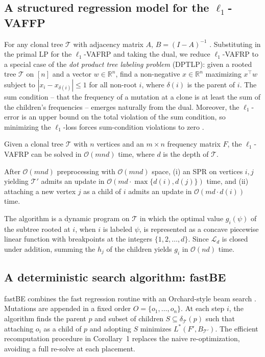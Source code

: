 \documentclass[11pt]{article}
\begin{document}
\subsection{A structured regression model for the $\ell_1$-VAFFP}
For any clonal tree $\mathcal{T}$ with adjacency matrix $A$, $B = (I - A)^{-1}$ \cite{elkebir2016copynumber}. Substituting in the primal LP for the $\ell_1$-VAFRP and taking the dual, we reduce $\ell_1$-VAFRP to a special case of the \emph{dot product tree labeling problem} (DPTLP): given a rooted tree $\mathcal{T}$ on $[n]$ and a vector $w \in \mathbb{R}^n$, find a non-negative $x \in \mathbb{R}^n$ maximizing $x^\top w$ subject to $|x_i - x_{\delta(i)}| \le 1$ for all non-root $i$, where $\delta(i)$ is the parent of $i$. The sum condition \cite{elkebir2015ancestree,popic2015lichee,malikic2015citup} -- that the frequency of a mutation at a clone is at least the sum of the children's frequencies -- emerges naturally from the dual. Moreover, the $\ell_1$-error is an upper bound on the total violation of the sum condition, so minimizing the $\ell_1$-loss forces sum-condition violations to zero \cite{bonizzoni2017sum}.

\begin{theorem}
Given a clonal tree $\mathcal{T}$ with $n$ vertices and an $m \times n$ frequency matrix $F$, the $\ell_1$-VAFRP can be solved in $\mathcal{O}(mnd)$ time, where $d$ is the depth of $\mathcal{T}$.
\end{theorem}

\begin{corollary}
After $\mathcal{O}(mnd)$ preprocessing with $\mathcal{O}(mnd)$ space, (i) an SPR on vertices $i,j$ yielding $\mathcal{T}'$ admits an update in $\mathcal{O}(md \cdot \max\{d(i),d(j)\})$ time, and (ii) attaching a new vertex $j$ as a child of $i$ admits an update in $\mathcal{O}(md \cdot d(i))$ time.
\end{corollary}

The algorithm is a dynamic program on $\mathcal{T}$ in which the optimal value $g_i(\psi)$ of the subtree rooted at $i$, when $i$ is labeled $\psi$, is represented as a concave piecewise linear function with breakpoints at the integers $\{1,2,\dots,d\}$. Since $\mathcal{L}_d$ is closed under addition, summing the $h_j$ of the children yields $g_i$ in $\mathcal{O}(nd)$ time.

\subsection{A deterministic search algorithm: fastBE}
fastBE combines the fast regression routine with an Orchard-style beam search \cite{kulman2024orchard}. Mutations are appended in a fixed order $O = \{o_1,\dots,o_n\}$. At each step $i$, the algorithm finds the parent $p$ and subset of children $S \subseteq \delta_{\mathcal{T}}(p)$ such that attaching $o_i$ as a child of $p$ and adopting $S$ minimizes $L^*(F', B_{\mathcal{T}'})$. The efficient recomputation procedure in Corollary~1 replaces the naive re-optimization, avoiding a full re-solve at each placement.
\end{document}
